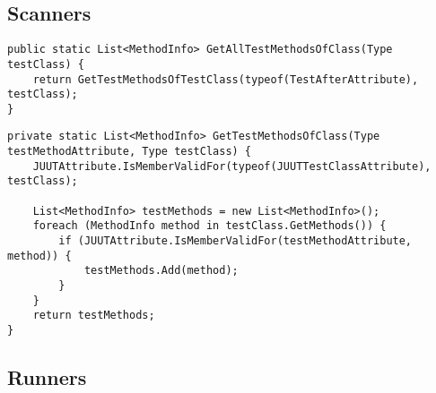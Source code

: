 \subsection{Scanners}
\label{sec:Appendix_Scanners}

\begin{lstlisting}[caption={[Quellcode der \textit{GetAllTestMethodsOfClass}-Methode von \textit{TestClassScanner}]Quellcode der \textit{GetAllTestMethodsOfClass}-Methode von \textit{TestClassScanner}}, label=code:TestClassScanner_GetAllTests]
public static List<MethodInfo> GetAllTestMethodsOfClass(Type testClass) {
    return GetTestMethodsOfTestClass(typeof(TestAfterAttribute), testClass);
}
\end{lstlisting}

\begin{lstlisting}[caption={[Quellcode der \textit{GetTestMethodsOfClass}-Methode von \textit{TestClassScanner}]Quellcode der \textit{GetTestMethodsOfClass}-Methode von \textit{TestClassScanner}}, label=code:TestClassScanner_GetTests]
private static List<MethodInfo> GetTestMethodsOfClass(Type testMethodAttribute, Type testClass) {
    JUUTAttribute.IsMemberValidFor(typeof(JUUTTestClassAttribute), testClass);

    List<MethodInfo> testMethods = new List<MethodInfo>();
    foreach (MethodInfo method in testClass.GetMethods()) {
        if (JUUTAttribute.IsMemberValidFor(testMethodAttribute, method)) {
            testMethods.Add(method);
        }
    }
    return testMethods;
}
\end{lstlisting}

\subsection{Runners}
\label{sec:Appendix_Runners}


